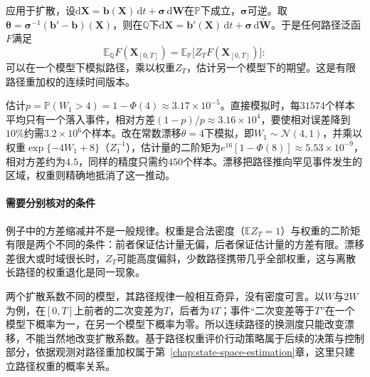 应用于扩散，设$\mathrm d\bm X=\bm b(\bm X)\,\mathrm dt+\bm\sigma\,\mathrm d\bm W$在$\mathbb P$下成立，$\bm\sigma$可逆。取$\bm\theta=\bm\sigma^{-1}(\bm b'-\bm b)(\bm X)$，则在$\mathbb Q$下$\mathrm d\bm X=\bm b'(\bm X)\,\mathrm dt+\bm\sigma\,\mathrm d\widetilde{\bm W}$。于是任何路径泛函$F$满足
\[
  \mathbb E_{\mathbb Q}F(\bm X_{[0,T]})=\mathbb E_{\mathbb P}\bigl[Z_TF(\bm X_{[0,T]})\bigr]:
\]
可以在一个模型下模拟路径，乘以权重$Z_T$，估计另一个模型下的期望。这是有限路径重加权的连续时间版本。

\begin{example}[用漂移估计罕见事件]
  \label{ex:ctsp-girsanov-rare-event}
  估计$p=\mathbb P(W_1>4)=1-\Phi(4)\approx3.17\times10^{-5}$。直接模拟时，每$31574$个样本平均只有一个落入事件，相对方差$(1-p)/p\approx3.16\times10^4$，要使相对误差降到$10\%$约需$3.2\times10^6$个样本。改在常数漂移$\theta=4$下模拟，即$W_1\sim\mathcal N(4,1)$，并乘以权重$\exp\{-4W_1+8\}$（$Z_1^{-1}$），估计量的二阶矩为$e^{16}[1-\Phi(8)]\approx5.53\times10^{-9}$，相对方差约为$4.5$，同样的精度只需约$450$个样本。漂移把路径推向罕见事件发生的区域，权重则精确地抵消了这一推动。
\end{example}

\paragraph{需要分别核对的条件}
例子中的方差缩减并不是一般规律。权重是合法密度（$\mathbb EZ_T=1$）与权重的二阶矩有限是两个不同的条件：前者保证估计量无偏，后者保证估计量的方差有限。漂移差很大或时域很长时，$Z_T$可能高度偏斜，少数路径携带几乎全部权重，这与离散长路径的权重退化是同一现象。

两个扩散系数不同的模型，其路径规律一般相互奇异，没有密度可言。以$W$与$2W$为例，在$[0,T]$上前者的二次变差为$T$，后者为$4T$；事件“二次变差等于$T$”在一个模型下概率为一，在另一个模型下概率为零。所以连续路径的换测度只能改变漂移，不能当然地改变扩散系数。基于路径权重评价行动策略属于后续的决策与控制部分，依据观测对路径重加权属于第~\ref{chap:state-space-estimation}章，这里只建立路径权重的概率关系。
